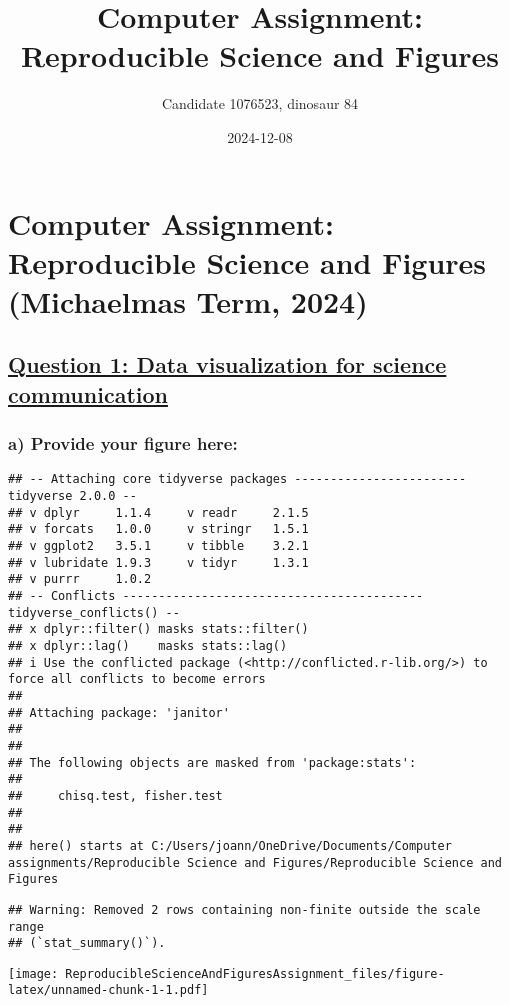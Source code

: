 \documentclass[
]{article}
\title{Computer Assignment: Reproducible Science and Figures}
\author{Candidate 1076523, dinosaur 84}
\date{2024-12-08}
\begin{document}
\maketitle

\section{Computer Assignment: Reproducible Science and Figures
(Michaelmas Term,
2024)}\label{computer-assignment-reproducible-science-and-figures-michaelmas-term-2024}

\subsection{\texorpdfstring{\ul{Question 1: Data visualization for
science
communication}}{Question 1: Data visualization for science communication}}\label{question-1-data-visualization-for-science-communication}

\subsubsection{a) Provide your figure
here:}\label{a-provide-your-figure-here}

\begin{verbatim}
## -- Attaching core tidyverse packages ------------------------ tidyverse 2.0.0 --
## v dplyr     1.1.4     v readr     2.1.5
## v forcats   1.0.0     v stringr   1.5.1
## v ggplot2   3.5.1     v tibble    3.2.1
## v lubridate 1.9.3     v tidyr     1.3.1
## v purrr     1.0.2     
## -- Conflicts ------------------------------------------ tidyverse_conflicts() --
## x dplyr::filter() masks stats::filter()
## x dplyr::lag()    masks stats::lag()
## i Use the conflicted package (<http://conflicted.r-lib.org/>) to force all conflicts to become errors
## 
## Attaching package: 'janitor'
## 
## 
## The following objects are masked from 'package:stats':
## 
##     chisq.test, fisher.test
## 
## 
## here() starts at C:/Users/joann/OneDrive/Documents/Computer assignments/Reproducible Science and Figures/Reproducible Science and Figures
\end{verbatim}

\begin{verbatim}
## Warning: Removed 2 rows containing non-finite outside the scale range
## (`stat_summary()`).
\end{verbatim}

\texttt{[image: ReproducibleScienceAndFiguresAssignment\_files/figure-latex/unnamed-chunk-1-1.pdf]}
\end{document}
